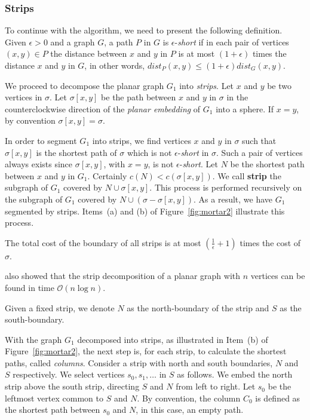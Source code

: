 \subsubsection{Strips}

To continue with the algorithm, we need to present the following definition. Given $\epsilon > 0$ and a graph \(G\), a path \(P\) in \(G\) is \(\epsilon\)-\textit{short} if in each pair of vertices \((x, y) \in P\) the distance between \(x\) and \(y\) in \(P\) is at most \((1 + \epsilon)\) times the distance \(x\) and \(y\) in \(G\), in other words, \(dist_P(x, y) \leq (1 + \epsilon) dist_G(x, y)\).

We proceed to decompose the planar graph \(G_1\) into \textit{strips}. Let \(x\) and \(y\) be two vertices in \(\sigma\). Let \(\sigma[x, y]\) be the path between \(x\) and \(y\) in \(\sigma\) in the counterclockwise direction of the \textit{planar embedding} of \(G_1\) into a sphere. If \(x = y\), by convention \(\sigma[x, y] = \sigma\).

In order to segment \(G_1\) into strips, we find vertices \(x\) and \(y\) in \(\sigma\) such that \(\sigma[x, y]\) is the shortest path of \(\sigma\) which is not \(\epsilon\)-\textit{short} in \(\sigma\). Such a pair of vertices always exists since \(\sigma[x, y]\), with \(x = y\), is not \(\epsilon\)-\textit{short}. Let \(N\) be the shortest path between \(x\) and \(y\) in \(G_1\). Certainly \(c(N) < c(\sigma[x, y])\). We call \textbf{strip} the subgraph of \(G_1\) covered by \(N \cup \sigma[x, y]\). This process is performed recursively on the subgraph of \(G_1\) covered by \(N \cup (\sigma - \sigma[x, y])\). As a result, we have \(G_1\) segmented by strips. Items~(a) and (b) of Figure~\ref{fig:mortar2} illustrate this process.

\begin{flemma} \label{strip_length}
The total cost of the boundary of all strips is at most \((\frac{1}{\epsilon} + 1)\) times the cost of \(\sigma\).
\end{flemma}

\citeauthor{klein2006} also showed that the strip decomposition of a planar graph with \(n\) vertices can be found in time \(\mathcal{O}(n \log n)\).

Given a fixed strip, we denote \(N\) as the north-boundary of the strip and \(S\) as the south-boundary.

With the graph \(G_1\) decomposed into strips, as illustrated in Item~(b) of Figure~\ref{fig:mortar2}, the next step is, for each strip, to calculate the shortest paths, called \textit{columns}. Consider a strip with north and south boundaries, \(N\) and \(S\) respectively. We select vertices \(s_0, s_1, \dots\) in \(S\) as follows. We embed the north strip above the south strip, directing \(S\) and \(N\) from left to right. Let \(s_0\) be the leftmost vertex common to \(S\) and \(N\). By convention, the column \(C_0\) is defined as the shortest path between \(s_0\) and \(N\), in this case, an empty path.


